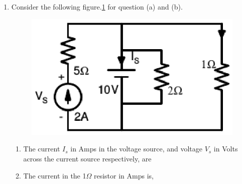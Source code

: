\documentclass[journal,12pt,twocolumn]{IEEEtran}
\begin{document}
\begin{enumerate}
\item Consider the following figure.\ref{fig91} for question (a) and (b).
\begin{figure}[!h]
\begin{center}
\includegraphics[scale=0.7]{./figs/fig91.eps}
\caption{}
\label{fig91}
\end{center}
\end{figure}

\begin{enumerate}
 
\item  The current $ I_{s} $ in Amps in the voltage source, and voltage $ V_{s} $ in Volts across the current source respectively, are
\begin{enumerate}
\end{enumerate}

\item The current in the 1$ \Omega $ resistor in Amps is,
\begin{enumerate}
\end{enumerate}
\end{enumerate}



\end{enumerate}
\end{document}

